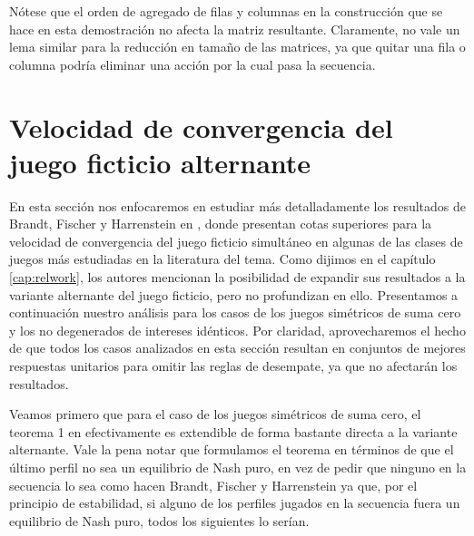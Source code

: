 Nótese que el orden de agregado de filas y columnas en la construcción que se hace en esta demostración no afecta la matriz resultante. Claramente, no vale un lema similar para la reducción en tamaño de las matrices, ya que quitar una fila o columna podría eliminar una acción por la cual pasa la secuencia.


\section{Velocidad de convergencia del juego ficticio alternante} \label{sec:aportes:velocidad}

En esta sección nos enfocaremos en estudiar más detalladamente los resultados de Brandt, Fischer y Harrenstein en \cite{brandt:rate:convergence}, donde presentan cotas superiores para la velocidad de convergencia del juego ficticio simultáneo en algunas de las clases de juegos más estudiadas en la literatura del tema. Como dijimos en el capítulo \ref{cap:relwork}, los autores mencionan la posibilidad de expandir sus resultados a la variante alternante del juego ficticio, pero no profundizan en ello. Presentamos a continuación nuestro análisis para los casos de los juegos simétricos de suma cero y los no degenerados de intereses idénticos. Por claridad, aprovecharemos el hecho de que todos los casos analizados en esta sección resultan en conjuntos de mejores respuestas unitarios para omitir las reglas de desempate, ya que no afectarán los resultados.

Veamos primero que para el caso de los juegos simétricos de suma cero, el teorema 1 en \cite{brandt:rate:convergence} efectivamente es extendible de forma bastante directa a la variante alternante. Vale la pena notar que formulamos el teorema en términos de que el último perfil no sea un equilibrio de Nash puro, en vez de pedir que ninguno en la secuencia lo sea como hacen Brandt, Fischer y Harrenstein ya que, por el principio de estabilidad, si alguno de los perfiles jugados en la secuencia fuera un equilibrio de Nash puro, todos los siguientes lo serían.

